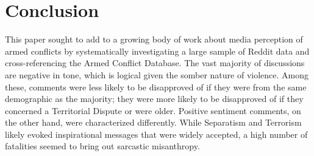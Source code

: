 \section{Conclusion}
This paper sought to add to a growing body of work about media perception of armed conflicts by systematically investigating a large sample of Reddit data and cross-referencing the Armed Conflict Database. The vast majority of discussions are negative in tone, which is logical given the somber nature of violence. Among these, comments were less likely to be disapproved of if they were from the same demographic as the majority; they were more likely to be disapproved of if they concerned a Territorial Dispute or were older. Positive sentiment comments, on the other hand, were characterized differently. While Separatism and Terrorism likely evoked inspirational messages that were widely accepted, a high number of fatalities seemed to bring out sarcastic misanthropy.